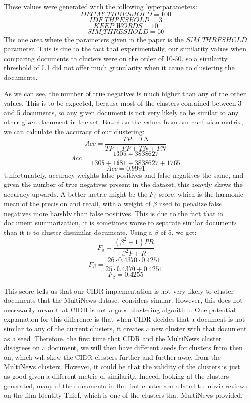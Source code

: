 \documentclass[../writeup.tex]{subfiles}
\begin{document}
These values were generated with the following hyperparameters:
$$DECAY\_THRESHOLD = 100$$
$$IDF\_THRESHOLD = 3$$
$$KEEP\_WORDS = 10$$
$$SIM\_THRESHOLD = 50$$
The one area where the parameters given in the paper is the $SIM\_THRESHOLD$ parameter.\autocite*[]{cidr-clustering}
This is due to the fact that experimentally, our similarity values when comparing documents to clusters were on the order of 10-50, so a similarity threshold of 0.1 did not offer much granularity when it came to clustering the documents.

As we can see, the number of true negatives is much higher than any of the other values.
This is to be expected, because most of the clusters contained between 3 and 5 documents, so any given document is not very likely to be similar to any other given document in the set.
Based on the values from our confusion matrix, we can calculate the accuracy of our clustering:
$$ Acc = \frac{TP + TN}{TP + FP + TN + FN}$$
$$ Acc = \frac{1305 + 3838627}{1305 + 1681 + 3838627 + 1765}$$
$$ Acc = 0.9991$$
Unfortunately, accuracy weights false positives and false negatives the same, and given the number of true negatives present in the dataset, this heavily skews the accuracy upwards.
A better metric might be the $F_\beta$ score, which is the harmonic mean of the precision and recall, with a weight of $\beta$ used to penalize false negatives more harshly than false positives.
This is due to the fact that in document summarization, it is sometimes worse to separate similar documents than it is to cluster dissimilar documents.\autocite*[]{information-retrieval} Using a $\beta$ of 5, we get:
$$F_\beta = \frac{(\beta^2+1)PR}{\beta^2P + R} $$
$$F_\beta = \frac{26 \cdot 0.4370 \cdot 0.4251}{25\cdot 0.4370 + 0.4251}$$
$$F_\beta = 0.4255 $$

This score tells us that our CIDR implementation is not very likely to cluster documents that the MultiNews dataset considers similar.
However, this does not necessarily mean that CIDR is not a good clustering algorithm. One potential explanation for this difference is that when CIDR decides that a document is not similar to any of the current clusters, it creates a new cluster with that document as a seed.
Therefore, the first time that CIDR and the MultiNews cluster disagrees on a document, we will then have different seeds for clusters from then on, which will skew the CIDR clusters further and further away from the MultiNews clusters.
However, it could be that the validity of the clusters is just as good given a different metric of similarity. Indeed, looking at the clusters generated, many of the documents in the first cluster are related to movie reviews on the film Identity Thief, which is one of the clusters that MultiNews provided.
\end{document}

